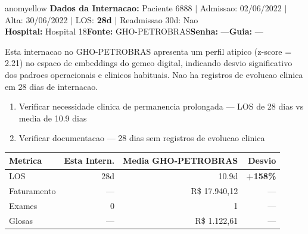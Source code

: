 \documentclass[a4paper,10pt]{article}
\begin{document}
\begin{anomalycard}[Internacao 6777 | GHO-PETROBRAS | MODERADO (z=2.21)]{anomyellow}
\textbf{Dados da Internacao:} Paciente 6888 $\mid$ Admissao: 02/06/2022 $\mid$ Alta: 30/06/2022 $\mid$ LOS: \textbf{28d} $\mid$ Readmissao 30d: Nao\\
\textbf{Hospital:} Hospital 18\quad\textbf{Fonte:} GHO-PETROBRAS\quad\textbf{Senha:} ---\quad\textbf{Guia:} ---\\
\vspace{2pt}\begin{tcolorbox}[colback=severityred!20,colframe=anomyellow,title={\textbf{Interpretacao de Negocio}},fonttitle=\bfseries\small,left=4pt,right=4pt,top=3pt,bottom=3pt]
{\small Esta internacao no GHO-PETROBRAS apresenta um perfil atipico (z-score = 2.21) no espaco de embeddings do gemeo digital, indicando desvio significativo dos padroes operacionais e clinicos habituais. Nao ha registros de evolucao clinica em 28 dias de internacao.}
\end{tcolorbox}
\begin{tcolorbox}[colback=severityyellow!30,colframe=anomorange,title={\textbf{Recomendacoes Especificas}},fonttitle=\bfseries\small,left=4pt,right=4pt,top=3pt,bottom=3pt]
\begin{enumerate}[nosep,leftmargin=16pt]
\item {\small Verificar necessidade clinica de permanencia prolongada --- LOS de 28 dias vs media de 10.9 dias}
\item {\small Verificar documentacao --- 28 dias sem registros de evolucao clinica}
\end{enumerate}
\end{tcolorbox}
\begin{center}\begin{tabular}{l r r r}\toprule\textbf{Metrica} & \textbf{Esta Intern.} & \textbf{Media GHO-PETROBRAS} & \textbf{Desvio} \\\midrule
LOS & 28d & 10.9d & \textcolor{anomred}{\textbf{+158\%}} \\
Faturamento & --- & R\$ 17.940,12 & --- \\
Exames & 0 & 1 & --- \\
Glosas & --- & R\$ 1.122,61 & --- \\
\bottomrule\end{tabular}\end{center}


\end{anomalycard}
\end{document}
